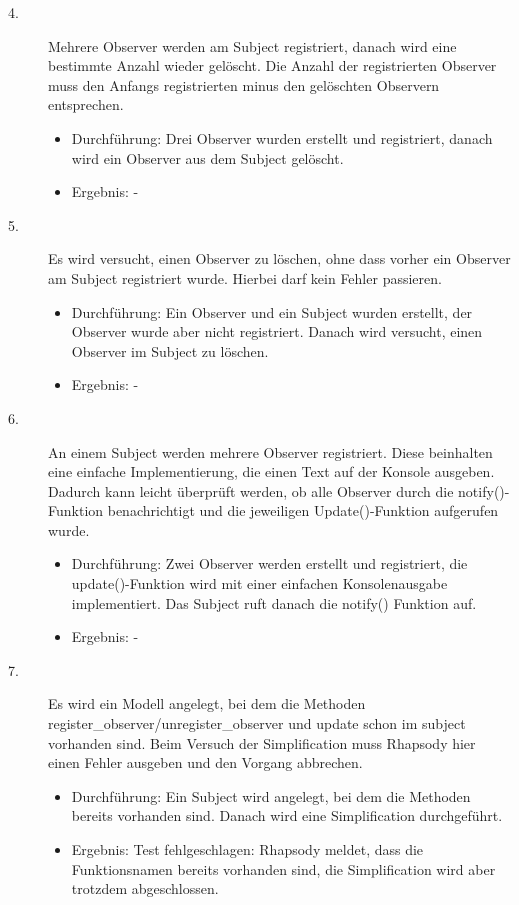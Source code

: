\begin{description}
	\item[4.]
	Mehrere Observer werden am Subject registriert, danach wird eine bestimmte Anzahl wieder gelöscht. Die Anzahl der registrierten Observer muss den Anfangs registrierten minus den gelöschten Observern entsprechen.
	\begin{itemize}
  		\item{Durchführung:}
			Drei Observer wurden erstellt und registriert, danach wird ein Observer aus
			dem Subject gelöscht.
  		\item{Ergebnis:}
			-
  	\end{itemize}
	
	\item[5.]
	Es wird versucht, einen Observer zu löschen, ohne dass vorher ein Observer am
	Subject registriert wurde. Hierbei darf kein Fehler passieren.
	\begin{itemize}
  		\item{Durchführung:}
			Ein Observer und ein Subject wurden erstellt, der Observer wurde aber nicht
			registriert. Danach wird versucht, einen Observer im Subject zu löschen.
  		\item{Ergebnis:}
			-
  	\end{itemize}
  	
	\item[6.]
	An einem Subject werden mehrere Observer registriert. Diese beinhalten eine einfache Implementierung, die einen Text auf der Konsole ausgeben. Dadurch kann leicht überprüft werden, ob alle Observer durch die notify()-Funktion benachrichtigt und die jeweiligen Update()-Funktion aufgerufen wurde.
	\begin{itemize}
  		\item{Durchführung:}
			Zwei Observer werden erstellt und registriert, die update()-Funktion wird
			mit einer einfachen Konsolenausgabe implementiert. Das Subject ruft danach
			die notify() Funktion auf.
  		\item{Ergebnis:}
			-
  	\end{itemize}
  	
	\item[7.]
	Es wird ein Modell angelegt, bei dem die Methoden
	register_observer/unregister_observer und update schon im subject vorhanden
	sind.
	Beim Versuch der Simplification muss Rhapsody hier einen Fehler ausgeben und den Vorgang abbrechen.
	\begin{itemize}
  		\item{Durchführung:}
			Ein Subject wird angelegt, bei dem die Methoden bereits vorhanden sind.
			Danach wird eine Simplification durchgeführt.
  		\item{Ergebnis:}
			Test fehlgeschlagen: Rhapsody meldet, dass die Funktionsnamen bereits
			vorhanden sind, die Simplification wird aber trotzdem abgeschlossen.
  	\end{itemize}
	

\end{description}
